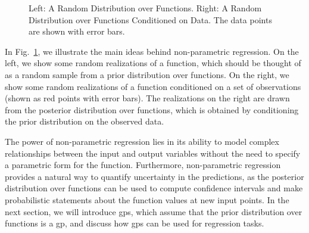 \begin{figure}[htbp]
{
} %
\caption{Left: A Random Distribution over Functions. Right: A Random Distribution over Functions Conditioned on Data. The data points are shown with error bars.}
\label{fig:ntools:gp_prior_posterior}
\end{figure}

In Fig.~\ref{fig:ntools:gp_prior_posterior}, we illustrate the main ideas behind non-parametric regression. On the left, we show some random realizations of a function, which should be thought of as a random sample from a prior distribution over functions. On the right, we show some random realizations of a function conditioned on a set of observations (shown as red points with error bars). The realizations on the right are drawn from the posterior distribution over functions, which is obtained by conditioning the prior distribution on the observed data. 

\smallskip
The power of non-parametric regression lies in its ability to model complex relationships between the input and output variables without the need to specify a parametric form for the function. Furthermore, non-parametric regression provides a natural way to quantify uncertainty in the predictions, as the posterior distribution over functions can be used to compute confidence intervals and make probabilistic statements about the function values at new input points. In the next section, we will introduce \glspl{gp}, which assume that the prior distribution over functions is a \gls{gp}, and discuss how \glspl{gp} can be used for regression tasks.


